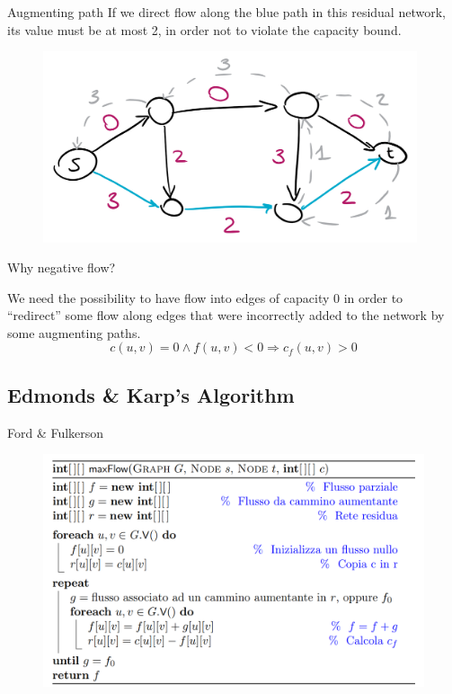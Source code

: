 \documentclass{beamer}
\begin{document}
    \begin{frame}{Augmenting path}
        If we direct flow along the blue path in this residual network, its value must be at most
        2, in order not to violate the capacity bound.
        \begin{figure}[!htb]
            \includegraphics[width=110mm]{bottleneck}
        \end{figure}
    \end{frame}

    \begin{frame}{Why negative flow?}
        \begin{Large}
        We need the possibility to have flow into edges of capacity 0 in order to ``redirect''
        some flow along edges that were incorrectly added to the network by some augmenting paths.\\
        $$c(u,v) = 0 \land f(u,v) < 0 \Rightarrow c_f(u,v) > 0$$
        \end{Large}
    \end{frame}
    \subsection{Edmonds \& Karp's Algorithm}

    \begin{frame}{Ford \& Fulkerson}
        \begin{figure}
            \includegraphics[width=120mm]{fordfulkerson}
        \end{figure}
    \end{frame}
\end{document}
